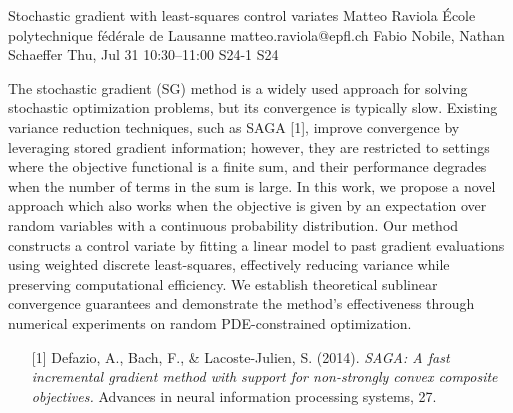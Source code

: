 \begin{talk}
  {Stochastic gradient with least-squares control variates}%
  {Matteo Raviola}%
  {École polytechnique fédérale de Lausanne}%
  {matteo.raviola@epfl.ch}%
  {Fabio Nobile, Nathan Schaeffer}%
  {}%
  {Thu, Jul 31 10:30–11:00}%
  {S24-1}%
  {S24}%
  
  
  
  The stochastic gradient (SG) method is a widely used approach for solving stochastic optimization problems, but its convergence is typically slow.
  Existing variance reduction techniques, such as SAGA [1], improve convergence by leveraging stored gradient information; however, they are restricted to settings where the objective functional is a finite sum, and their performance degrades when the number of terms in the sum is large.
  In this work, we propose a novel approach which also works when the objective is given by an expectation over random variables with a continuous probability distribution.
  Our method constructs a control variate by fitting a linear model to past gradient evaluations using weighted discrete least-squares, effectively reducing variance while preserving computational efficiency.
  We establish theoretical sublinear convergence guarantees and demonstrate the method's effectiveness through numerical experiments on random PDE-constrained optimization.
  
  \medskip
  
  \begin{enumerate}
    \item[{[1]}] Defazio, A., Bach, F., \& Lacoste-Julien, S. (2014). {\it SAGA: A fast incremental gradient method with support for non-strongly convex composite objectives.} Advances in neural information processing systems, 27.
  \end{enumerate}
  
\end{talk}

